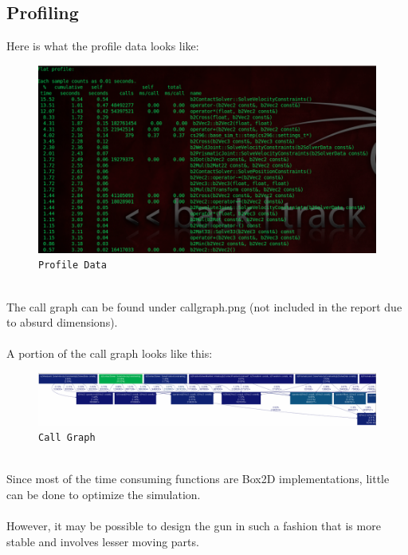 \documentclass{article}
\begin{document}
\subsection{Profiling}
Here is what the profile data looks like:
\\
\begin{figure}[hbtp]
\centering
\includegraphics[scale=0.3]{profile.png}
\caption{\texttt{Profile Data}}
\end{figure}
\\
The call graph can be found under callgraph.png (not included in the report due to absurd dimensions).
\\
\\
A portion of the call graph looks like this:
\\
\begin{figure}[hbtp]
\centering
\includegraphics[scale=0.3]{callgraph_part.png}
\caption{\texttt{Call Graph}}
\end{figure}
\\
Since most of the time consuming functions are Box2D implementations, little can be done to optimize the simulation.
\\
\\
However, it may be possible to design the gun in such a fashion that is more stable and involves lesser moving parts.
\pagebreak


\end{document}
